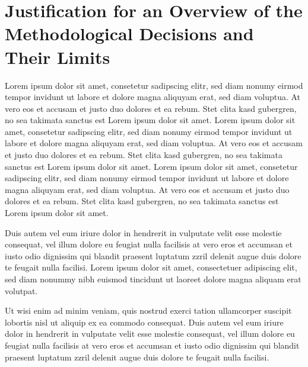 \section{Justification for an Overview of the Methodological Decisions and Their Limits}
Lorem ipsum dolor sit amet, consetetur sadipscing elitr,  sed diam nonumy eirmod
tempor invidunt ut labore et dolore magna aliquyam erat, sed diam voluptua. At
vero eos et accusam et justo duo dolores et ea rebum. Stet clita kasd gubergren,
no sea takimata sanctus est Lorem ipsum dolor sit amet. Lorem ipsum dolor sit
amet, consetetur sadipscing elitr,  sed diam nonumy eirmod tempor invidunt ut
labore et dolore magna aliquyam erat, sed diam voluptua. At vero eos et accusam
et justo duo dolores et ea rebum. Stet clita kasd gubergren, no sea takimata
sanctus est Lorem ipsum dolor sit amet. Lorem ipsum dolor sit amet, consetetur
sadipscing elitr,  sed diam nonumy eirmod tempor invidunt ut labore et dolore
magna aliquyam erat, sed diam voluptua. At vero eos et accusam et justo duo
dolores et ea rebum. Stet clita kasd gubergren, no sea takimata sanctus est
Lorem ipsum dolor sit amet.

Duis autem vel eum iriure dolor in hendrerit in vulputate velit esse molestie
consequat, vel illum dolore eu feugiat nulla facilisis at vero eros et accumsan
et iusto odio dignissim qui blandit praesent luptatum zzril delenit augue duis
dolore te feugait nulla facilisi. Lorem ipsum dolor sit amet, consectetuer
adipiscing elit, sed diam nonummy nibh euismod tincidunt ut laoreet dolore
magna aliquam erat volutpat.

Ut wisi enim ad minim veniam, quis nostrud exerci tation ullamcorper suscipit
lobortis nisl ut aliquip ex ea commodo consequat. Duis autem vel eum iriure
dolor in hendrerit in vulputate velit esse molestie consequat, vel illum dolore
eu feugiat nulla facilisis at vero eros et accumsan et iusto odio dignissim qui
blandit praesent luptatum zzril delenit augue duis dolore te feugait nulla
facilisi.

